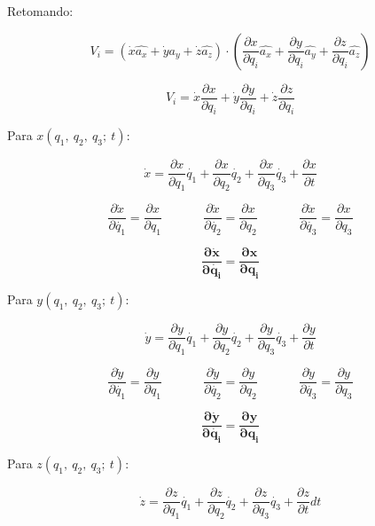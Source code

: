 \documentclass[]{article}
\begin{document}
Retomando:

\[V_{i} = \left( \dot{x}\widehat{a_{x}} + \dot{y}\widehat{a_{y}} + \dot{z}\widehat{a_{z}} \right) \cdot \left( \frac{\partial x}{\partial q_{i}}\widehat{a_{x}} + \frac{\partial y}{\partial q_{i}}\widehat{a_{y}} + \frac{\partial z}{\partial q_{i}}\widehat{a_{z}} \right)\]

\[V_{i} = \dot{x}\frac{\partial x}{\partial q_{i}} + \dot{y}\frac{\partial y}{\partial q_{i}} + \dot{z}\frac{\partial z}{\partial q_{i}}\]

Para \(x\left( q_{1},\ q_{2},\ q_{3};\ t \right)\):

\[\dot{x} = \frac{\partial x}{\partial q_{1}}\dot{q_{1}} + \frac{\partial x}{\partial q_{2}}\dot{q_{2}} + \frac{\partial x}{\partial q_{3}}\dot{q_{3}} + \frac{\partial x}{\partial t}\]

\[\frac{\partial\dot{x}}{\partial\dot{q_{1}}} = \frac{\partial x}{\partial q_{1}}\ \ \ \ \ \ \ \ \ \ \ \ \ \ \ \frac{\partial\dot{x}}{\partial\dot{q_{2}}} = \frac{\partial x}{\partial q_{2}}\ \ \ \ \ \ \ \ \ \ \ \ \ \ \ \frac{\partial\dot{x}}{\partial\dot{q_{3}}} = \frac{\partial x}{\partial q_{3}}\]

\[\frac{\mathbf{\partial}\dot{\mathbf{x}}}{\mathbf{\partial}\dot{\mathbf{q}_{\mathbf{i}}}}\mathbf{=}\frac{\mathbf{\partial x}}{\mathbf{\partial}\mathbf{q}_{\mathbf{i}}}\]

Para \(y\left( q_{1},\ q_{2},\ q_{3};\ t \right)\):

\[\dot{y} = \frac{\partial y}{\partial q_{1}}\dot{q_{1}} + \frac{\partial y}{\partial q_{2}}\dot{q_{2}} + \frac{\partial y}{\partial q_{3}}\dot{q_{3}} + \frac{\partial y}{\partial t}\]

\[\frac{\partial\dot{y}}{\partial\dot{q_{1}}} = \frac{\partial y}{\partial q_{1}}\ \ \ \ \ \ \ \ \ \ \ \ \ \ \ \frac{\partial\dot{y}}{\partial\dot{q_{2}}} = \frac{\partial y}{\partial q_{2}}\ \ \ \ \ \ \ \ \ \ \ \ \ \ \ \frac{\partial\dot{y}}{\partial\dot{q_{3}}} = \frac{\partial y}{\partial q_{3}}\]

\[\frac{\mathbf{\partial}\dot{\mathbf{y}}}{\mathbf{\partial}\dot{\mathbf{q}_{\mathbf{i}}}}\mathbf{=}\frac{\mathbf{\partial y}}{\mathbf{\partial}\mathbf{q}_{\mathbf{i}}}\]

Para \(z\left( q_{1},\ q_{2},\ q_{3};\ t \right)\):

\[\dot{z} = \frac{\partial z}{\partial q_{1}}\dot{q_{1}} + \frac{\partial z}{\partial q_{2}}\dot{q_{2}} + \frac{\partial z}{\partial q_{3}}\dot{q_{3}} + \frac{\partial z}{\partial t}dt\]
\end{document}

